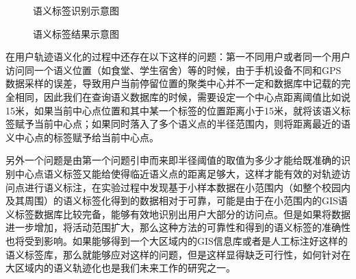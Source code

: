 \begin{figure}[htb]
  \centering%
  \hspace{2em}%
  \hspace{2em}%
  \caption{语义标签识别示意图}
  \label{fig:matchlabel}
\end{figure}





\begin{figure}[htb]
  \centering%
  \hspace{4em}%
  \hspace{4em}%
  \caption{语义标签结果示意图}
  \label{fig:map_label}
\end{figure}
\par 在用户轨迹语义化的过程中还存在以下这样的问题：第一不同用户或者同一个用户访问同一个语义位置（如食堂、学生宿舍）等的时候，由于手机设备不同和GPS数据采样的误差，导致用户当前停留位置的聚类中心并不一定和数据库中记载的完全相同，因此我们在查询语义数据库的时候，需要设定一个中心点距离阈值比如说15米，如果当前中心点位置和其中某一个标签的位置距离小于15米，就将该语义标签赋予当前中心点；如果同时落入了多个语义点的半径范围内，则将距离最近的语义中心点的标签赋予给当前中心点。
\par 另外一个问题是由第一个问题引申而来即半径阈值的取值为多少才能给既准确的识别中心点语义标签又能给使得临近语义点的距离足够大，这样才能有效的对轨迹访问点进行语义标注，在实验过程中发现基于小样本数据在小范围内（如整个校园内及其周围）的语义标签化得到的数据相对于可靠，可能是由于在小范围内的GIS语义标签数据库比较完备，能够有效地识别出用户大部分的访问点。但是如果将数据进一步增加，将活动范围扩大，那么这种方法的可靠性和得到的语义标签的准确性也将受到影响。如果能够得到一个大区域内的GIS信息库或者是人工标注好这样的语义标签库，那么就能够应对这样的问题，但是这样显得缺乏可行性，如何针对在大区域内的语义轨迹化也是我们未来工作的研究之一。
